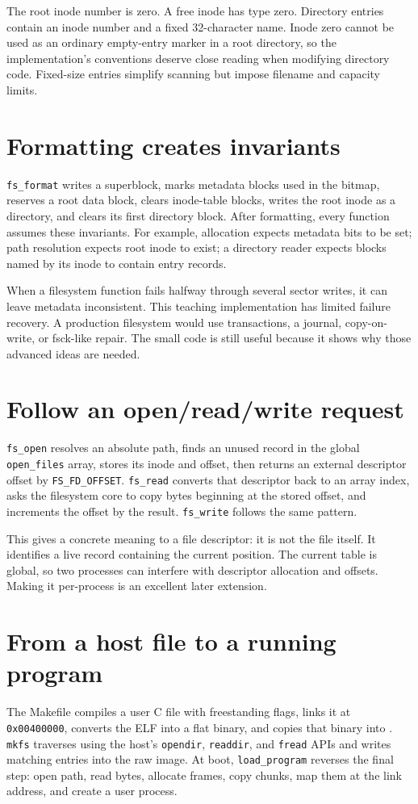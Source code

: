 The root inode number is zero. A free inode has type zero. Directory entries contain an inode number and a fixed 32-character name. Inode zero cannot be used as an ordinary empty-entry marker in a root directory, so the implementation's conventions deserve close reading when modifying directory code. Fixed-size entries simplify scanning but impose filename and capacity limits.

\section{Formatting creates invariants}
\texttt{fs\_format} writes a superblock, marks metadata blocks used in the bitmap, reserves a root data block, clears inode-table blocks, writes the root inode as a directory, and clears its first directory block. After formatting, every function assumes these invariants. For example, allocation expects metadata bits to be set; path resolution expects root inode to exist; a directory reader expects blocks named by its inode to contain entry records.

When a filesystem function fails halfway through several sector writes, it can leave metadata inconsistent. This teaching implementation has limited failure recovery. A production filesystem would use transactions, a journal, copy-on-write, or fsck-like repair. The small code is still useful because it shows why those advanced ideas are needed.

\section{Follow an open/read/write request}
\texttt{fs\_open} resolves an absolute path, finds an unused record in the global \texttt{open\_files} array, stores its inode and offset, then returns an external descriptor offset by \texttt{FS\_FD\_OFFSET}. \texttt{fs\_read} converts that descriptor back to an array index, asks the filesystem core to copy bytes beginning at the stored offset, and increments the offset by the result. \texttt{fs\_write} follows the same pattern.

This gives a concrete meaning to a file descriptor: it is not the file itself. It identifies a live record containing the current position. The current table is global, so two processes can interfere with descriptor allocation and offsets. Making it per-process is an excellent later extension.

\section{From a host file to a running program}
The Makefile compiles a user C file with freestanding flags, links it at \texttt{0x00400000}, converts the ELF into a flat binary, and copies that binary into . \texttt{mkfs} traverses  using the host's \texttt{opendir}, \texttt{readdir}, and \texttt{fread} APIs and writes matching entries into the raw image. At boot, \texttt{load\_program} reverses the final step: open path, read bytes, allocate frames, copy chunks, map them at the link address, and create a user process.

